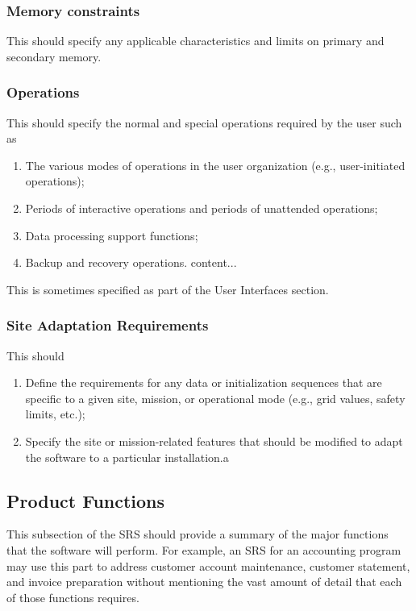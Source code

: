 \documentclass[draftclsnofoot,onecolumn,10pt]{IEEEtran}
\begin{document}
\begin{enumerate}
\subsubsection{Memory constraints}
This should specify any applicable characteristics and limits on primary and
secondary memory.

\subsubsection{Operations}
This should specify the normal and special operations required by the user such as
\begin{enumerate}
	\item The various modes of operations in the user organization (e.g.,
		user-initiated operations);
	\item Periods of interactive operations and periods of unattended operations;
	\item Data processing support functions;
	\item Backup and recovery operations.	content...
\end{enumerate}

This is sometimes specified as part of the User Interfaces section.

\subsubsection{Site Adaptation Requirements}
This should
\begin{enumerate}
	\item Define the requirements for any data or initialization sequences that
		are specific to a given site, mission, or operational mode (e.g., grid
		values, safety limits, etc.);
	\item Specify the site or mission-related features that should be modified
		to adapt the software to a particular installation.a
\end{enumerate}

\subsection{Product Functions}
This subsection of the SRS should provide a summary of the major functions that
the software will perform. For example, an SRS for an accounting program may use
this part to address customer account maintenance, customer statement, and
invoice preparation without mentioning the vast amount of detail that each of
those functions requires.\par


\end{enumerate}
\end{document}
